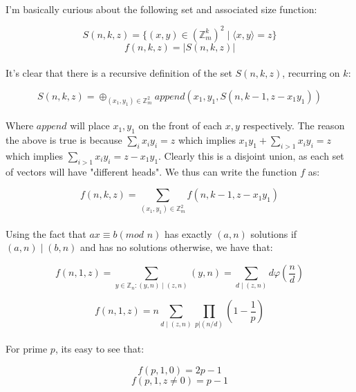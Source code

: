 \documentclass{article}
\begin{document}
\paragraph*{}
  I'm basically curious about the following set and associated size function:

\[S(n, k, z) = \{ (x, y) \in (\mathbb{Z}_m^k)^2 \mid \langle x, y \rangle = z \} \] 
\[f(n, k, z) = |S(n, k, z)| \]

\paragraph*{}
  It's clear that there is a recursive definition of the set $S(n, k, z)$, recurring
  on $k$:

\[ S(n, k, z) = \oplus_{(x_1, y_1) \in \mathbb{Z}_m^2} append(x_1, y_1, S(n, k - 1, z - x_1y_1)) \]

\paragraph*{}
  Where $append$ will place $x_1, y_1$ on the front of each $x, y$ respectively. The reason
  the above is true is because $\sum_i x_i y_i = z$ which implies $x_1 y_1 + \sum_{i>1} x_i y_i = z$
  which implies $\sum_{i>1}x_iy_i = z - x_1y_1$. Clearly this is a disjoint union, as each
  set of vectors will have "different heads". We thus can write the function $f$ as:

\[ f(n, k, z) = \sum_{(x_1, y_1) \in \mathbb{Z}_m^2} f(n, k - 1, z - x_1y_1) \]

\paragraph*{}
  Using the fact that $ax \equiv b (\textit{mod } n)$ has exactly $(a, n)$ solutions if $(a, n) \mid
  (b, n)$ and has no solutions otherwise, we have that:

\[ f(n, 1, z) = \sum_{y \in \mathbb{Z}_n : (y, n) \mid (z, n)} (y, n) = \sum_{d \mid (z, n)} d \varphi(\frac{n}{d}) \]

\[ f(n, 1, z) = n \sum_{d \mid (z, n)} \prod_{p | (n / d)} (1 - \frac{1}{p}) \]

\paragraph*{}
  For prime $p$, its easy to see that:

\[ f(p, 1, 0) = 2p - 1 \]
\[ f(p, 1, z \neq 0) = p - 1 \]
\end{document}
